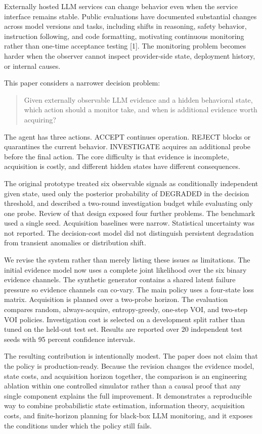 \documentclass[
]{article}
\begin{document}
Externally hosted LLM services can change behavior even when the service interface remains stable. Public evaluations have documented substantial changes across model versions and tasks, including shifts in reasoning, safety behavior, instruction following, and code formatting, motivating continuous monitoring rather than one-time acceptance testing {[}1{]}. The monitoring problem becomes harder when the observer cannot inspect provider-side state, deployment history, or internal causes.

This paper considers a narrower decision problem:

\begin{quote}
Given externally observable LLM evidence and a hidden behavioral state, which action should a monitor take, and when is additional evidence worth acquiring?
\end{quote}

The agent has three actions. ACCEPT continues operation. REJECT blocks or quarantines the current behavior. INVESTIGATE acquires an additional probe before the final action. The core difficulty is that evidence is incomplete, acquisition is costly, and different hidden states have different consequences.

The original prototype treated six observable signals as conditionally independent given state, used only the posterior probability of DEGRADED in the decision threshold, and described a two-round investigation budget while evaluating only one probe. Review of that design exposed four further problems. The benchmark used a single seed. Acquisition baselines were narrow. Statistical uncertainty was not reported. The decision-cost model did not distinguish persistent degradation from transient anomalies or distribution shift.

We revise the system rather than merely listing these issues as limitations. The initial evidence model now uses a complete joint likelihood over the six binary evidence channels. The synthetic generator contains a shared latent failure pressure so evidence channels can co-vary. The main policy uses a four-state loss matrix. Acquisition is planned over a two-probe horizon. The evaluation compares random, always-acquire, entropy-greedy, one-step VOI, and two-step VOI policies. Investigation cost is selected on a development split rather than tuned on the held-out test set. Results are reported over 20 independent test seeds with 95 percent confidence intervals.

The resulting contribution is intentionally modest. The paper does not claim that the policy is production-ready. Because the revision changes the evidence model, state costs, and acquisition horizon together, the comparison is an engineering ablation within one controlled simulator rather than a causal proof that any single component explains the full improvement. It demonstrates a reproducible way to combine probabilistic state estimation, information theory, acquisition costs, and finite-horizon planning for black-box LLM monitoring, and it exposes the conditions under which the policy still fails.
\end{document}
